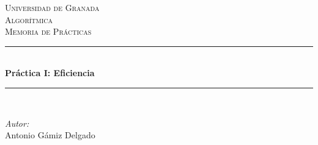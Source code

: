 \begin{titlepage}

\newcommand{\HRule}{\rule{\linewidth}{0.5mm}} %

\center %
 

\textsc{\LARGE Universidad de Granada}\\[1.5cm] %
\textsc{\Large Algorítmica}\\[0.5cm] %
\textsc{\large Memoria de Prácticas}\\[0.5cm] %


\HRule \\[0.4cm]
{ \huge \bfseries Práctica I: Eficiencia}\\[0.4cm] %
\HRule \\[1.5cm]
 

\begin{minipage}{0.4\textwidth}
\begin{flushleft} \large
\emph{Autor:}\\
Antonio Gámiz Delgado \textsc{} %
\end{flushleft}
\end{minipage}
~
\begin{minipage}{0.4\textwidth}
\begin{flushright} \large
\emph{} \\
\textsc{} %
\end{flushright}
\end{minipage}\\[2cm]



\end{titlepage}
